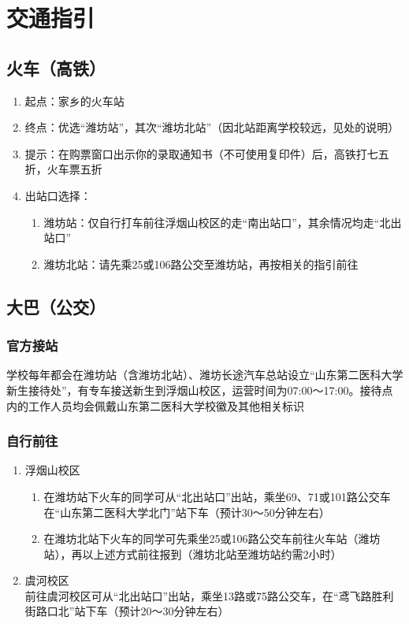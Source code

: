 
\section[交通指引]{交通指引}
\label{goto_school}
\subsection[火车（高铁）]{火车（高铁）}
\begin{enumerate}
    \item 起点：家乡的火车站
    \item 终点：优选“潍坊站”，其次“潍坊北站”（因北站距离学校较远，见处的说明）
    \item 提示：在购票窗口出示你的录取通知书（不可使用复印件）后，高铁打七五折，火车票五折
    \item 出站口选择：
          \begin{enumerate}
              \item 潍坊站：仅自行打车前往浮烟山校区的走“南出站口”，其余情况均走“北出站口”
              \item 潍坊北站：请先乘25或106路公交至潍坊站，再按相关的指引前往
          \end{enumerate}
\end{enumerate}

\subsection[大巴（公交）]{大巴（公交）}

\subsubsection[官方接站]{官方接站}
学校每年都会在潍坊站（含潍坊北站）、潍坊长途汽车总站设立“山东第二医科大学新生接待处”，有专车接送新生到浮烟山校区，运营时间为07:00～17:00。接待点内的工作人员均会佩戴山东第二医科大学校徽及其他相关标识

\subsubsection[自行前往]{自行前往}
\label{bus}
\begin{enumerate}
    \item 浮烟山校区
          \begin{enumerate}
              \item 在潍坊站下火车的同学可从“北出站口”出站，乘坐69、71或101路公交车在“山东第二医科大学北门”站下车（预计30～50分钟左右）
              \item 在潍坊北站下火车的同学可先乘坐25或106路公交车前往火车站（潍坊站），再以上述方式前往报到（潍坊北站至潍坊站约需2小时）
          \end{enumerate}
    \item 虞河校区\\
          前往虞河校区可从“北出站口”出站，乘坐13路或75路公交车，在“鸢飞路胜利街路口北”站下车（预计20～30分钟左右）
\end{enumerate}

